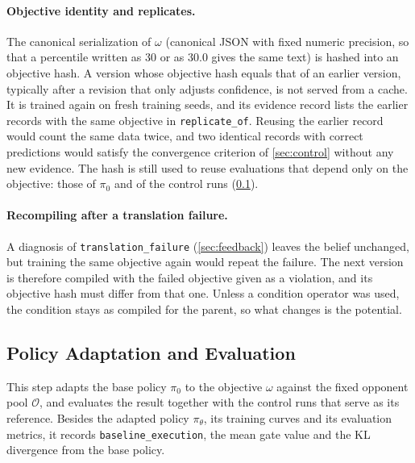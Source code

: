 \documentclass[11pt]{article}
\newcommand{\opp}{\mathcal{O}}           %
\newcommand{\code}[1]{\texttt{\small #1}}
\begin{document}
\paragraph{Objective identity and replicates.}
The canonical serialization of $\omega$ (canonical JSON with fixed numeric precision, so that a percentile written as 30 or as 30.0 gives the same text) is hashed into an objective hash.
A version whose objective hash equals that of an earlier version, typically after a revision that only adjusts confidence, is not served from a cache.
It is trained again on fresh training seeds, and its evidence record lists the earlier records with the same objective in \code{replicate\_of}.
Reusing the earlier record would count the same data twice, and two identical records with correct predictions would satisfy the convergence criterion of \cref{sec:control} without any new evidence.
The hash is still used to reuse evaluations that depend only on the objective: those of $\pi_0$ and of the control runs (\cref{sec:adapt}).

\paragraph{Recompiling after a translation failure.}
A diagnosis of \code{translation\_failure} (\cref{sec:feedback}) leaves the belief unchanged, but training the same objective again would repeat the failure.
The next version is therefore compiled with the failed objective given as a violation, and its objective hash must differ from that one.
Unless a condition operator was used, the condition stays as compiled for the parent, so what changes is the potential.

\subsection{Policy Adaptation and Evaluation}
\label{sec:adapt}

This step adapts the base policy $\pi_0$ to the objective $\omega$ against the fixed opponent pool $\opp$, and evaluates the result together with the control runs that serve as its reference.
Besides the adapted policy $\pi_\theta$, its training curves and its evaluation metrics, it records \code{baseline\_execution}, the mean gate value and the KL divergence from the base policy.
\end{document}
